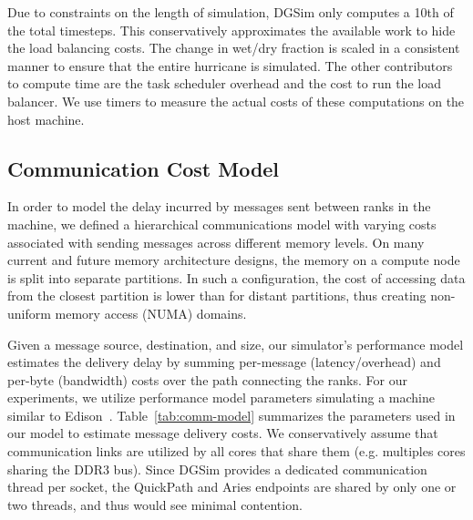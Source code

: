 Due to constraints on the length of simulation, DGSim only computes a 10th of the total timesteps. This conservatively approximates the available work to hide the load balancing costs. The change in wet/dry fraction is scaled in a consistent manner to ensure that the entire hurricane is simulated.
The other contributors to compute time are the task scheduler overhead and the cost to run the load balancer.
We use timers to measure the actual costs of these computations on the host machine.

\subsection{Communication Cost Model}

In order to model the delay incurred by messages sent between ranks in
the machine, we defined a hierarchical communications model with varying
costs associated with sending messages across different memory levels.
On many current and future memory architecture designs, the memory on
a compute node is split into separate partitions.
In such a configuration, the cost of accessing data from the closest
partition is lower than for distant partitions, thus
creating non-uniform memory access (NUMA) domains.

Given a message source, destination, and size,
our simulator's performance model estimates the delivery delay by
summing per-message (latency/overhead) and per-byte
(bandwidth) costs over the path connecting the ranks.
For our experiments, we utilize performance model parameters simulating
a machine similar to Edison~\cite{edison-config}.
Table~\ref{tab:comm-model} summarizes the parameters used in our
model to estimate message delivery costs.
We conservatively assume that communication links are utilized
by all cores that share them (e.g. multiples cores sharing the DDR3 bus).
Since DGSim provides a dedicated communication thread per socket,
the QuickPath and Aries endpoints are shared by only one or two
threads, and thus would see minimal contention.

